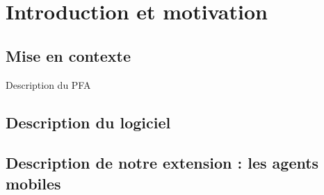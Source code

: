 \chapter{Introduction et motivation}

\section{Mise en contexte}

Description du PFA

\section{Description du logiciel \visidia}



\section{Description de notre extension : les agents mobiles}




